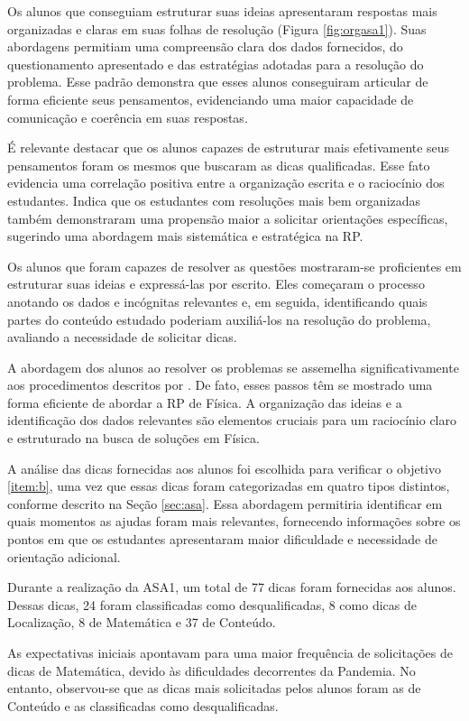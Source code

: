 Os alunos que conseguiam estruturar suas ideias apresentaram respostas mais organizadas e claras em suas folhas de resolução (Figura \ref{fig:orgasa1}). Suas abordagens permitiam uma compreensão clara dos dados fornecidos, do questionamento apresentado e das estratégias adotadas para a resolução do problema. Esse padrão demonstra que esses alunos conseguiram articular de forma eficiente seus pensamentos, evidenciando uma maior capacidade de comunicação e coerência em suas respostas.

É relevante destacar que os alunos capazes de estruturar mais efetivamente seus pensamentos foram os mesmos que buscaram as dicas qualificadas. Esse fato evidencia uma correlação positiva entre a organização escrita e o raciocínio dos estudantes. Indica que os estudantes com resoluções mais bem organizadas também demonstraram uma propensão maior a solicitar orientações específicas, sugerindo uma abordagem mais sistemática e estratégica na RP.

Os alunos que foram capazes de resolver as questões mostraram-se proficientes em estruturar suas ideias e expressá-las por escrito. Eles começaram o processo anotando os dados e incógnitas relevantes e, em seguida, identificando quais partes do conteúdo estudado poderiam auxiliá-los na resolução do problema, avaliando a necessidade de solicitar dicas. 

A abordagem dos alunos ao resolver os problemas se assemelha significativamente aos procedimentos descritos por . De fato, esses passos têm se mostrado uma forma eficiente de abordar a RP de Física. A organização das ideias e a identificação dos dados relevantes são elementos cruciais para um raciocínio claro e estruturado na busca de soluções em Física.

A análise das dicas fornecidas aos alunos foi escolhida para verificar o objetivo \ref{item:b}, uma vez que essas dicas foram categorizadas em quatro tipos distintos, conforme descrito na Seção \ref{sec:asa}. Essa abordagem permitiria identificar em quais momentos as ajudas foram mais relevantes, fornecendo informações sobre os pontos em que os estudantes apresentaram maior dificuldade e necessidade de orientação adicional.

Durante a realização da ASA1, um total de 77 dicas foram fornecidas aos alunos. Dessas dicas, 24 foram classificadas como desqualificadas, 8 como dicas de Localização, 8 de Matemática e 37 de Conteúdo. 

As expectativas iniciais apontavam para uma maior frequência de solicitações de dicas de Matemática, devido às dificuldades decorrentes da Pandemia. No entanto, observou-se que as dicas mais solicitadas pelos alunos foram as de Conteúdo e as classificadas como desqualificadas.

